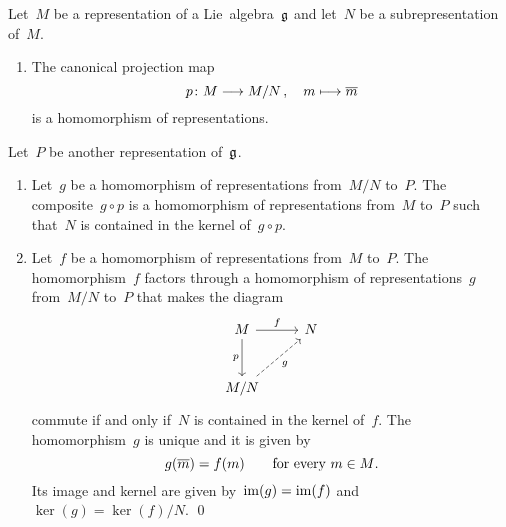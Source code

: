 \begin{proposition}
	Let~$M$ be a representation of a Lie~algebra~$\mathfrak{g}$ and let~$N$ be a subrepresentation of~$M$.
	\begin{enumerate}
		\item
			The canonical projection map
			\[
				p
				\colon
				M
				\to
				M/N \,,
				\quad
				m
				\mapsto
				\class{m}
			\]
			is a homomorphism of representations.
	\end{enumerate}
	Let~$P$ be another representation of~$\mathfrak{g}$.
	\begin{enumerate}[resume*]
		\item
			Let~$g$ be a homomorphism of representations from~$M/N$ to~$P$.
			The composite~$g \circ p$ is a homomorphism of representations from~$M$ to~$P$ such that~$N$ is contained in the kernel of~$g \circ p$.
		\item
			Let~$f$ be a homomorphism of representations from~$M$ to~$P$.
			The homomorphism~$f$ factors through a homomorphism of representations~$g$ from~$M/N$ to~$P$ that makes the diagram
			\[
				\begin{tikzcd}[row sep = large]
					M
					\arrow{r}[above]{f}
					\arrow{d}[left]{p}
					&
					N
					\\
					M/N
					\arrow[dashed]{ur}[below right]{g}
					&
					{}
				\end{tikzcd}
			\]
			commute if and only if~$N$ is contained in the kernel of~$f$.
			The homomorphism~$g$ is unique and it is given by
			\[
				g(\overline{m}) = f(m)
				\qquad
				\text{for every~$m \in M$.}
			\]
			Its image and kernel are given by~$\operatorname{im}(g) = \operatorname{im}(f)$ and~$\ker(g) = \ker(f)/N$.
		\qed
	\end{enumerate}
\end{proposition}


